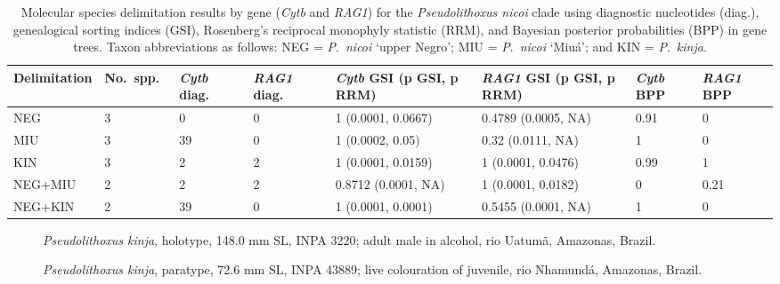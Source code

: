 \documentclass[12pt]{article}
\begin{document}
\newpage
\begin{table}[htbp]
\scriptsize
\caption{Molecular species delimitation results by gene (\emph{Cytb} and \emph{RAG1}) for the \emph{Pseudolithoxus nicoi} clade using diagnostic nucleotides (diag.), genealogical sorting indices (GSI), Rosenberg's reciprocal monophyly statistic (RRM), and Bayesian posterior probabilities (BPP) in gene trees. %
Taxon abbreviations as follows: NEG = \emph{P}.\ \emph{nicoi} `upper Negro'; MIU = \emph{P}.\ \emph{nicoi} `Miuá'; and KIN = \emph{P}.\ \emph{kinja}.}
\begin{tabular}{llllllll}
\toprule
Delimitation & No.\ spp.\ & \emph{Cytb} diag.\ & \emph{RAG1} diag.\ & \emph{Cytb} GSI (p GSI, p RRM) & \emph{RAG1} GSI (p GSI, p RRM) & \emph{Cytb} BPP & \emph{RAG1} BPP\\
\midrule
NEG & 3 & 0 & 0 & 1 (0.0001, 0.0667) & 0.4789 (0.0005, NA) & 0.91 & 0\\
MIU & 3 & 39 & 0 & 1 (0.0002, 0.05) & 0.32 (0.0111, NA) & 1 & 0\\
KIN & 3 & 2 & 2 & 1 (0.0001, 0.0159) & 1 (0.0001, 0.0476) & 0.99 & 1\\
NEG+MIU & 2 & 2 & 2 & 0.8712 (0.0001, NA) & 1 (0.0001, 0.0182) & 0 & 0.21\\
NEG+KIN & 2 & 39 & 0 & 1 (0.0001, 0.0001) & 0.5455 (0.0001, NA) & 1 & 0\\
\bottomrule
\end{tabular}
\label{tab:metrics}
\end{table}


\newpage

\begin{figure}[!htbp]
\caption{\emph{Pseudolithoxus kinja}, holotype, 148.0 mm SL, INPA 3220; adult male in alcohol, rio Uatumã, Amazonas, Brazil.}
\begin{center}
\end{center}
\label{fig:holotype}
\end{figure}

\begin{figure}[!htbp]
\caption{\emph{Pseudolithoxus kinja}, paratype, 72.6 mm SL, INPA 43889; live colouration of juvenile, rio Nhamundá, Amazonas, Brazil.}
\begin{center}
\end{center}
\label{fig:paratype}
\end{figure}
\end{document}
